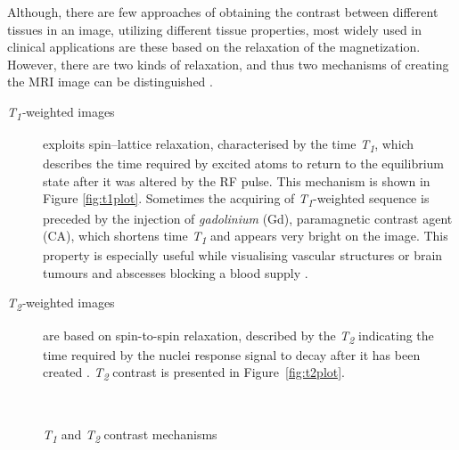 Although, there are few approaches of obtaining the contrast between different tissues in an image, utilizing different tissue properties, most widely used in clinical applications are these based on the relaxation of the magnetization. However, there are two kinds of relaxation, and thus two mechanisms of creating the MRI image can be distinguished \cite{biomedical_hanbook_imaging}.
\begin{description}
		\item [\textit{T\textsubscript{1}-}weighted images] exploits spin–lattice relaxation, characterised by the time \textit{T\textsubscript{1}}, which describes the time required by excited atoms to return to the equilibrium state after it was altered by the RF pulse. This mechanism is shown in Figure \ref{fig:t1plot}. Sometimes the acquiring of \textit{T\textsubscript{1}}-weighted sequence is preceded by the injection of \textit{gadolinium} (Gd), paramagnetic contrast agent (CA), which  shortens time \textit{T\textsubscript{1}} and appears very bright on the image. This property is especially useful while visualising vascular structures or brain tumours and abscesses blocking a blood supply \cite{biomedical_hanbook_imaging, grover2015magnetic}.   
		
		\item [\textit{T\textsubscript{2}-}weighted images] are based on spin-to-spin relaxation, described by the \textit{T\textsubscript{2}} indicating the time required by the nuclei response signal to decay after it has been created \cite{biomedical_hanbook_imaging, grover2015magnetic}. \textit{T\textsubscript{2}} contrast is presented in Figure~\ref{fig:t2plot}. 
\end{description}
\begin{figure}[H]
\captionsetup[subfloat]{captionskip=0.5cm}
	\centering
	\hspace{1.5cm}
	\\	
\vspace{0.5cm}
\caption[\textit{T\textsubscript{1}} and \textit{T\textsubscript{2}} contrast mechanisms]{\textit{T\textsubscript{1}} and \textit{T\textsubscript{2}} contrast mechanisms \cite{biomedical_hanbook_imaging}}
\label{fig:t1t2plot}
\end{figure}

